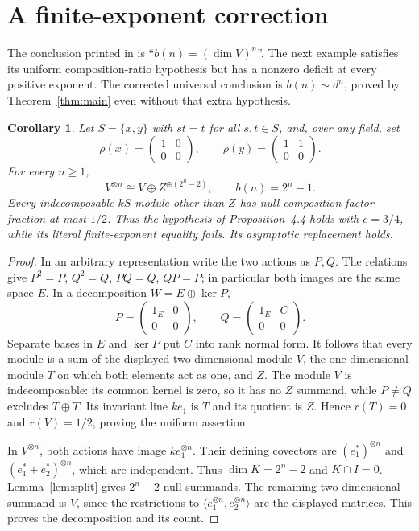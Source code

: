 \documentclass[11pt]{article}
\newtheorem{corollary}[theorem]{Corollary}
\begin{document}
\section{A finite-exponent correction}
The conclusion printed in \cite[Proposition~4.4, p.~17]{HT25} is
``\(b(n)=(\dim V)^n\)''. The next example satisfies its uniform
composition-ratio hypothesis but has a nonzero deficit at every positive
exponent. The corrected universal conclusion is \(b(n)\sim d^n\), proved
by Theorem~\ref{thm:main} even without that extra hypothesis.

\begin{corollary}\label{cor:rightzero}
Let \(S=\{x,y\}\) with \(st=t\) for all \(s,t\in S\), and, over any field, set
\[
 \rho(x)=\begin{pmatrix}1&0\\0&0\end{pmatrix},\qquad
 \rho(y)=\begin{pmatrix}1&1\\0&0\end{pmatrix}.
\]
For every \(n\geq1\),
\[
 V^{\otimes n}\cong V\oplus Z^{\oplus(2^n-2)},\qquad b(n)=2^n-1.
\]
Every indecomposable \(kS\)-module other than \(Z\) has null
composition-factor fraction at most \(1/2\). Thus the hypothesis of
Proposition~4.4 holds with \(c=3/4\), while its literal finite-exponent
equality fails. Its asymptotic replacement holds.
\end{corollary}
\begin{proof}
In an arbitrary representation write the two actions as \(P,Q\). The relations
give \(P^2=P\), \(Q^2=Q\), \(PQ=Q\), \(QP=P\); in particular both images
are the same space \(E\). In a decomposition \(W=E\oplus\ker P\),
\[
 P=\begin{pmatrix}1_E&0\\0&0\end{pmatrix},\qquad
 Q=\begin{pmatrix}1_E&C\\0&0\end{pmatrix}.
\]
Separate bases in \(E\) and \(\ker P\) put \(C\) into rank normal form.
It follows that every module is a sum of the displayed two-dimensional module
\(V\), the one-dimensional module \(T\) on which both elements act as one,
and \(Z\). The module \(V\) is indecomposable: its common kernel is zero,
so it has no \(Z\) summand, while \(P\ne Q\) excludes \(T\oplus T\).
Its invariant line \(ke_1\) is \(T\) and its quotient is \(Z\).
Hence \(r(T)=0\) and \(r(V)=1/2\), proving the uniform assertion.

In \(V^{\otimes n}\), both actions have image \(k e_1^{\otimes n}\).
Their defining covectors are \((e_1^*)^{\otimes n}\) and
\((e_1^*+e_2^*)^{\otimes n}\), which are independent. Thus \(\dim K=2^n-2\)
and \(K\cap I=0\). Lemma~\ref{lem:split} gives \(2^n-2\) null summands.
The remaining two-dimensional summand is \(V\), since the restrictions to
\(\langle e_1^{\otimes n},e_2^{\otimes n}\rangle\) are the displayed
matrices. This proves the decomposition and its count.
\end{proof}
\end{document}
